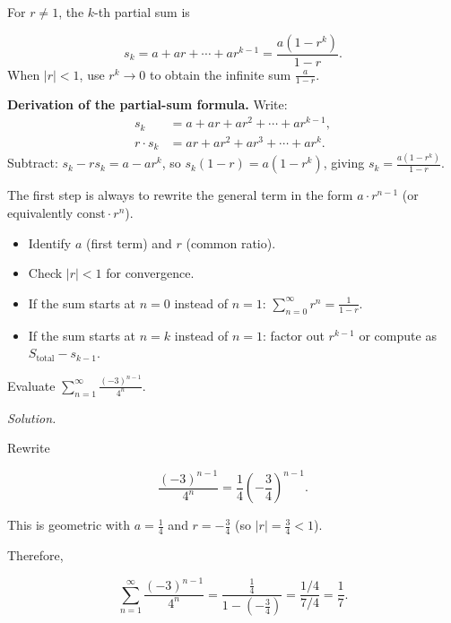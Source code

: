 \begin{keyformula}[title={Geometric partial sum (exam setup)}]

For $r\ne 1$, the $k$-th partial sum is

\[
s_k=a+ar+\cdots+ar^{k-1}
=\frac{a(1-r^k)}{1-r}.
\]
When $|r|<1$, use $r^k\to 0$ to obtain the infinite sum $\frac{a}{1-r}$.

\end{keyformula}

\noindent
\textbf{Derivation of the partial-sum formula.}
Write:
\begin{align*}
s_k &= a + ar + ar^2 + \cdots + ar^{k-1},\\
r\cdot s_k &= ar + ar^2 + ar^3 + \cdots + ar^{k}.
\end{align*}
Subtract: $s_k - rs_k = a - ar^k$, so $s_k(1-r)=a(1-r^k)$, giving $s_k=\frac{a(1-r^k)}{1-r}$.

\begin{examtip}[title={Exam Focus: Identifying geometric series}]

The first step is always to rewrite the general term in the form $a\cdot r^{n-1}$ (or equivalently $\text{const}\cdot r^n$).

\begin{itemize}[leftmargin=*]
\item Identify $a$ (first term) and $r$ (common ratio).
\item Check $|r|<1$ for convergence.
\item If the sum starts at $n=0$ instead of $n=1$: $\sum_{n=0}^{\infty}r^n=\frac{1}{1-r}$.
\item If the sum starts at $n=k$ instead of $n=1$: factor out $r^{k-1}$ or compute as $S_{\text{total}}-s_{k-1}$.
\end{itemize}

\end{examtip}

\begin{examplebox}[title={Worked Example: sum of a geometric series}]

Evaluate $\displaystyle \sum_{n=1}^{\infty}\frac{(-3)^{n-1}}{4^{n}}$.

\emph{Solution.}

Rewrite

\[
\frac{(-3)^{n-1}}{4^{n}}=\frac{1}{4}\left(-\frac{3}{4}\right)^{n-1}.
\]

This is geometric with $a=\frac14$ and $r=-\frac34$ (so $|r|=\frac34<1$).

Therefore,

\[
\boxed{\sum_{n=1}^{\infty}\frac{(-3)^{n-1}}{4^{n}}=\frac{\frac14}{1-(-\frac34)}=\frac{1/4}{7/4}=\frac{1}{7}.}
\]

\end{examplebox}

